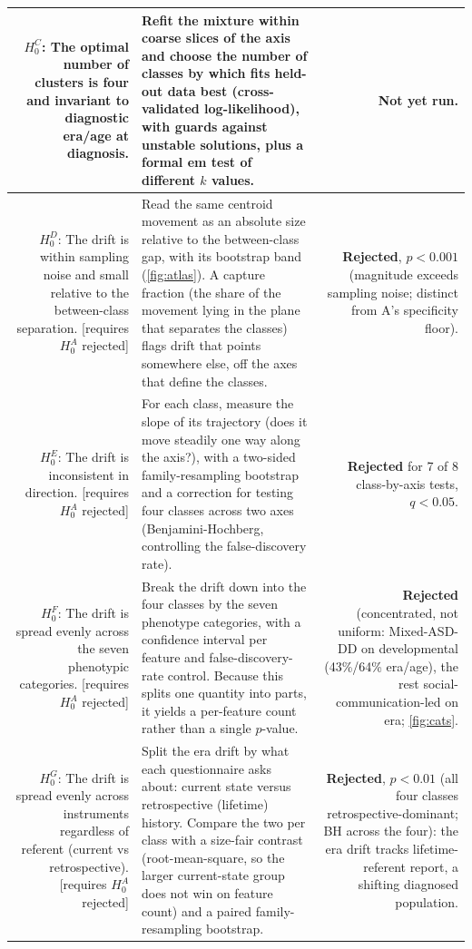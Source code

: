 \documentclass[11pt]{article}
\newcommand{\rej}{\textcolor{statusgreen}{\textbf{Rejected}}}
\newcommand{\sopen}[1]{\textcolor{statusorange}{#1}}
\begin{document}
\begin{xltabular}{\textwidth}{@{} N T R @{}}
$H_0^{C}$: The optimal number of clusters is four and invariant to diagnostic era/age at
diagnosis. &
Refit the mixture within coarse slices of the axis and choose the number of classes by which
fits held-out data best (cross-validated log-likelihood), with guards against unstable
solutions, plus a formal \ac{em} test of different $k$ values. &
\sopen{Not yet run.} \\
\midrule

$H_0^{D}$: The drift is within sampling noise and small relative to the between-class
separation. [requires $H_0^{A}$ rejected] &
Read the same centroid movement as an absolute size relative to the between-class gap, with its
bootstrap band (\autoref{fig:atlas}). A capture fraction (the share of the movement lying in the
plane that separates the classes) flags drift that points somewhere else, off the axes that define
the classes. &
\rej, $p<0.001$ (magnitude exceeds sampling noise; distinct from A's specificity
floor). \\
\midrule

$H_0^{E}$: The drift is inconsistent in direction. [requires $H_0^{A}$ rejected] &
For each class, measure the slope of its trajectory (does it move steadily one way along the
axis?), with a two-sided family-resampling bootstrap and a correction for testing four classes
across two axes (Benjamini-Hochberg, controlling the false-discovery rate). &
\rej{} for 7 of 8 class-by-axis tests, $q<0.05$. \\
\midrule

$H_0^{F}$: The drift is spread evenly across the seven phenotypic categories.
[requires $H_0^{A}$ rejected] &
Break the drift down into the four classes by the seven phenotype categories, with a confidence
interval per feature and false-discovery-rate control. Because this splits one quantity into
parts, it yields a per-feature count rather than a single $p$-value. &
\rej{} (concentrated, not uniform: Mixed-ASD-DD on developmental (43\%/64\% era/age),
the rest social-communication-led on era; \autoref{fig:cats}. \\
\midrule

$H_0^{G}$: The drift is spread evenly across instruments regardless of referent (current vs
retrospective). [requires $H_0^{A}$ rejected] &
Split the era drift by what each questionnaire asks about: current state versus retrospective
(lifetime) history. Compare the two per class with a size-fair contrast (root-mean-square, so the larger
current-state group does not win on feature count) and a paired family-resampling bootstrap. &
\rej, $p<0.01$ (all four classes retrospective-dominant; BH across the four): the
era drift tracks lifetime-referent report, a shifting diagnosed population. \\
\midrule


\end{xltabular}
\end{document}
